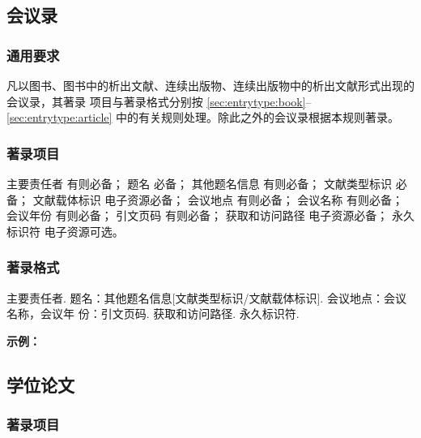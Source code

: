 \documentclass[twoside]{article}%
\begin{document}
\subsection{会议录}\label{sec:entrytype:proceed}

\subsubsection{通用要求}

凡以图书、图书中的析出文献、连续出版物、连续出版物中的析出文献形式出现的会议录，其著录
项目与著录格式分别按 \ref{sec:entrytype:book}--\ref{sec:entrytype:article} 中的有关规则处理。除此之外的会议录根据本规则著录。

\subsubsection{著录项目}

主要责任者 有则必备；
题名 必备；
其他题名信息 有则必备；
文献类型标识 必备；
文献载体标识 电子资源必备；
会议地点 有则必备；
会议名称 有则必备；
会议年份 有则必备；
引文页码 有则必备；
获取和访问路径 电子资源必备；
永久标识符 电子资源可选。

\subsubsection{著录格式}
主要责任者. 题名：其他题名信息[文献类型标识/文献载体标识]. 会议地点：会议名称，会议年
份：引文页码. 获取和访问路径. 永久标识符.


\begin{refsection}
\nocite{王莉2023--,牛志明2012--,中国社会科学院台湾史研究中心2012--,肖希明2024民国}
\nocite{汪学军2002-22-25,贾东琴2011-45-52a,陈志勇2011--}
\nocite{WANG2022ACAIT,HU2024SSDBM,Yufin2000--}
\nocite{Babu2014--,FOURNEY1971-17-38}

{

\textbf{示例：}

{\printbibliography[heading=none,env=indentegenv]}
}
\end{refsection}


\subsection{学位论文}\label{sec:entrytype:thesis}

\subsubsection{著录项目}
\end{document}
